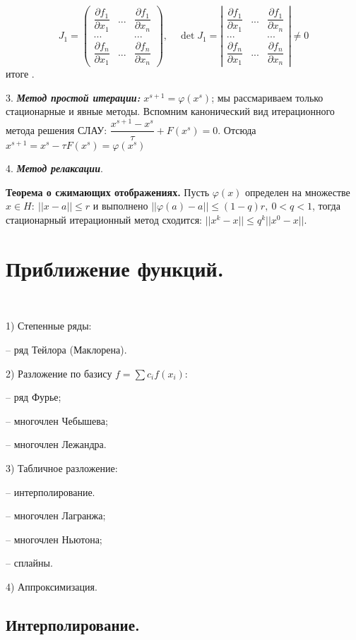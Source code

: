 \documentclass[9pt]{article}
\begin{document}
\[J_1=\left(
\begin{array}{ccc}
    \dfrac{\partial f_1}{\partial x_1} & ... & \dfrac{\partial f_1}{\partial x_n} \\
    ... & & ... \\
    \dfrac{\partial f_n}{\partial x_1} & ... & \dfrac{\partial f_n}{\partial x_n}
\end{array}
\right),\quad \det J_1=\left|
\begin{array}{ccc}
    \dfrac{\partial f_1}{\partial x_1} & ... & \dfrac{\partial f_1}{\partial x_n} \\
    ... & & ... \\
    \dfrac{\partial f_n}{\partial x_1} & ... & \dfrac{\partial f_n}{\partial x_n}
\end{array}
\right|\neq0\]
 итоге .
\par3.\textit{\textbf{ Метод простой итерации:}} \(x^{s+1} = \varphi(x^s)\);
 мы рассмариваем только стационарные и явные методы. Вспомним канонический вид итерационного метода решения СЛАУ: \(\dfrac{x^{s+1}-x^s}{\tau}+F(x^s)=0\). Отсюда \(x^{s+1}=x^s-\tau F(x^s)=\varphi(x^s)\)
\par4. \textit{\textbf{Метод релаксации}}.
\par\textbf{Теорема о сжимающих отображениях.} Пусть \(\varphi(x)\) определен на множестве \({x\in H:\ ||x-a||\le r}\) и выполнено \(||\varphi(a)-a||\le(1-q)r,\ 0<q<1\), тогда стационарный итерационный метод сходится: \(||x^k-x||\le q^k||x^0-x||\).

\section{Приближение функций.}

\ 
\par1) Степенные ряды:
\par-- ряд Тейлора (Маклорена).
\par2) Разложение по базису \(f=\displaystyle\sum c_if(x_i)\):
\par-- ряд Фурье;
\par-- многочлен Чебышева;
\par-- многочлен Лежандра.
\par3) Табличное разложение:
\par-- интерполирование.
\par\quad -- многочлен Лагранжа;
\par\quad -- многочлен Ньютона;
\par\quad -- сплайны.
\par4) Аппроксимизация.

\subsection{Интерполирование.}
\end{document}
